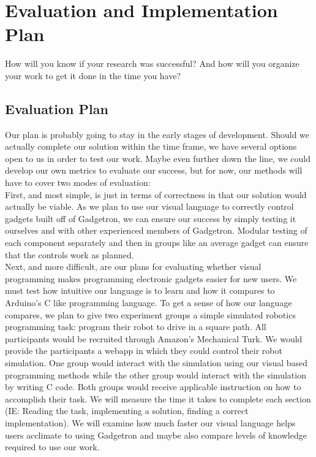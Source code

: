 \documentclass[12pt]{article}
\begin{document}
\section{Evaluation and Implementation Plan}
How will you know if your research was successful?  And how will you organize your work to get it done in the time you have?

\subsection{Evaluation Plan}
Our plan is probably going to stay in the early stages of development. Should we actually complete our solution within the time frame, we have several options open to us in order to test our work. Maybe even further down the line, we could develop our own metrics to evaluate our success, but for now, our methods will have to cover two modes of evaluation:\\[7pt]
First, and most simple, is just in terms of correctness in that our solution would actually be viable. As we plan to use our visual language to correctly control gadgets built off of Gadgetron, we can ensure our success by simply testing it ourselves and with other experienced members of Gadgetron. Modular testing of each component separately and then in groups like an average gadget can ensure that the controls work as planned.\\[7pt]
Next, and more difficult, are our plans for evaluating whether visual programming makes programming electronic gadgets easier for new users. We must test how intuitive our language is to learn and how it compares to Arduino's C like programming language. To get a sense of how our language compares, we plan to give two experiment groups a simple simulated robotics programming task: program their robot to drive in a square path. All participants would be recruited through Amazon's Mechanical Turk. We would provide the participants a webapp in which they could control their robot simulation. One group would interact with the simulation using our visual based programming methods while the other group would interact with the simulation by writing C code. Both groups would receive applicable instruction on how to accomplish their task. We will measure the time it takes to complete each section (IE: Reading the task, implementing a solution, finding a correct implementation). We will examine how much faster our visual language helps users acclimate to using Gadgetron and maybe also compare levels of knowledge required to use our work.
\end{document}
